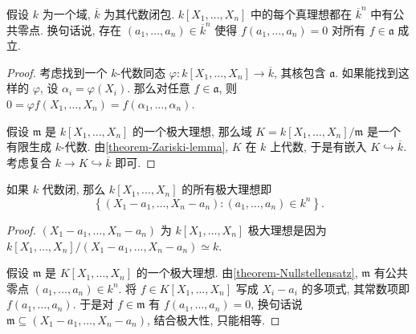 \begin{theorem}[Nullstellensatz]
  \label{theorem-Nullstellensatz}
  假设 \( k \) 为一个域, \( \overline{k} \) 为其代数闭包.
  \( k[X_1, \ldots, X_n] \) 中的每个真理想都在 \( \overline{k}^n \)
  中有公共零点.
  换句话说, 存在 \( (a_1, \ldots, a_n) \in \overline{k}^n \) 使得 \( f(a_1,
  \ldots, a_n) = 0 \) 对所有 \( f \in \mathfrak{a} \) 成立.
\end{theorem}
\begin{proof}
  考虑找到一个 \( k \)-代数同态 \( \varphi: k[X_1, \ldots, X_n] \to \overline{k}
  \), 其核包含 \( \mathfrak{a} \).
  如果能找到这样的 \( \varphi \), 设 \( \alpha_i = \varphi(X_i) \).
  那么对任意 \( f \in \mathfrak{a} \), 则 \( 0 = \varphi f(X_1, \ldots, X_n) =
  f(\alpha_1, \ldots, \alpha_n) \).

  假设 \( \mathfrak{m} \) 是 \( k[X_1, \ldots, X_n] \) 的一个极大理想, 那么域 \( K
  = k[X_1, \ldots, X_n]/ \mathfrak{m} \) 是一个有限生成 \( k \)-代数.
  由\cref{theorem-Zariski-lemma}, \( K \) 在 \( k \) 上代数, 于是有嵌入 \( K
  \hookrightarrow \overline{k} \).
  考虑复合 \( k \to K \hookrightarrow \overline{k} \) 即可.
\end{proof}

\begin{corollary}
  如果 \( k \) 代数闭, 那么 \( k[X_1, \ldots, X_n] \) 的所有极大理想即
  \[
    \left\lbrace (X_1 - a_1,\ldots, X_n - a_n): (a_1, \ldots, a_n) \in k^n
    \right\rbrace.
  \]
\end{corollary}
\begin{proof}
  \( (X_1 - a_1,\ldots, X_n - a_n) \) 为 \( k[X_1, \ldots, X_n] \)
  极大理想是因为 \( k[X_1, \ldots, X_n]/(X_1 - a_1,\ldots, X_n - a_n) \simeq k
  \).

  假设 \( \mathfrak{m} \) 是 \( K[X_1, \ldots, X_n] \) 的一个极大理想.
  由\cref{theorem-Nullstellensatz}, \( \mathfrak{m} \) 有公共零点 \( (a_1,
  \ldots, a_n) \in k^n \).
  将 \( f \in K[X_1, \ldots, X_n] \) 写成 \( X_i - a_i \) 的多项式, 其常数项即
  \( f(a_1, \ldots, a_n) \).
  于是对 \( f \in \mathfrak{m} \) 有 \( f(a_1, \ldots, a_n) = 0 \), 换句话说 \(
  \mathfrak{m} \subseteq (X_1 - a_1, \ldots, X_n - a_n) \), 结合极大性,
  只能相等.
\end{proof}

